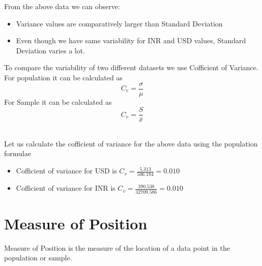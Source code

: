 \documentclass[twoside,12pt]{report}  %
\begin{document}
From the above data we can observe:
\begin{itemize}
	\item Variance values are comparatively larger than Standard Deviation
	\item Even though we have same variability for INR and USD values, Standard Deviation varies a lot. 
\end{itemize}
\noindent
To compare the variability of two different datasets we use Cofficient of Variance.
\\
For population it can be calculated as 
$$ \boxed{C_v = \frac{\sigma}{\mu}} $$
\noindent
For Sample it can be calculated as 
$$ \boxed{C_v = \frac{S}{\bar{x}}} $$
\\
\begin{tcolorbox}[colback=blue!5!white, colframe=blue!75!black, title = \textbf{Coefficient of Variance or Related Standard Deviation}]
	Let us calculate the cofficient of variance for the above data using the population formulae
	\begin{itemize}
		\item Cofficient of variance for USD is $ C_v = \frac{5.313}{506.184} = 0.010 $
		\item Cofficient of variance for INR is $ C_v = \frac{390.538}{32709.586} = 0.010 $
	\end{itemize}
\end{tcolorbox}
\noindent
\section{Measure of Position}
Measure of Position is the measure of the location of a data point in the population or sample.
\noindent
\end{document}
